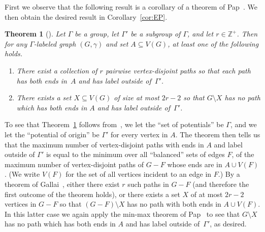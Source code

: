 \documentclass[11pt]{article}
\newtheorem{thm}{Theorem}[section]
\theoremstyle{definition}
\newcommand{\CM}[1]{\todo[linecolor=red,bordercolor=white,color=Magenta,backgroundcolor=CornflowerBlue!40,textcolor=black,size=\footnotesize]{\textsf{CM: #1}}}
\begin{document}

First we observe that the following result is a corollary of a theorem of Pap~\cite{PapAPaths}. We then obtain the desired result in Corollary~\ref{cor:EP}.


\begin{thm}[{\cite[Theorem~2.1]{PapAPaths}}]\label{thm:NonzeroAPathsEP}
    Let $\Gamma$ be a group, let $\Gamma'$ be a subgroup of $\Gamma$, and let $r\in \mathbb{Z}^+$. Then for any $\Gamma$-labeled graph $(G, \gamma)$ and set $A \subseteq V(G)$, at least one of the following holds.
    \begin{enumerate}
        \item There exist a collection of $r$ pairwise vertex-disjoint paths so that each path has both ends in~$A$ and has label outside of~$\Gamma'$.%
        \item There exists a set $X \subseteq V(G)$ of size at most $2r-2$ so that $G \setminus X$ has no path which has both ends in $A$ and has label outside of~$\Gamma'$.
    \end{enumerate}
\end{thm}

To see that Theorem~\ref{thm:NonzeroAPathsEP} follows from~\cite{PapAPaths}, we let the ``set of potentials'' be $\Gamma$, and we let the ``potential of origin'' be $\Gamma'$ for every vertex in $A$. The theorem then tells us that the maximum number of vertex-disjoint paths with ends in $A$ and label outside of $\Gamma'$ is equal to the minimum over all ``balanced'' sets of edges $F$, of the maximum number of vertex-disjoint paths of $G-F$ whose ends are in $A \cup V(F)$. (We write $V(F)$ for the set of all vertices incident to an edge in $F$.) By a theorem of Gallai~\cite{Gallai}, either there exist $r$ such paths in $G-F$ (and therefore the first outcome of the theorem holds), or there exists a set $X$ of at most $2r-2$ vertices in $G-F$ so that $(G-F)\setminus X$ has no path with both ends in $A \cup V(F)$. In this latter case we again apply the min-max theorem of Pap~\cite{PapAPaths} to see that $G\setminus X$ has no path which has both ends in $A$ and has label outside of~$\Gamma'$, as desired.
\end{document}

